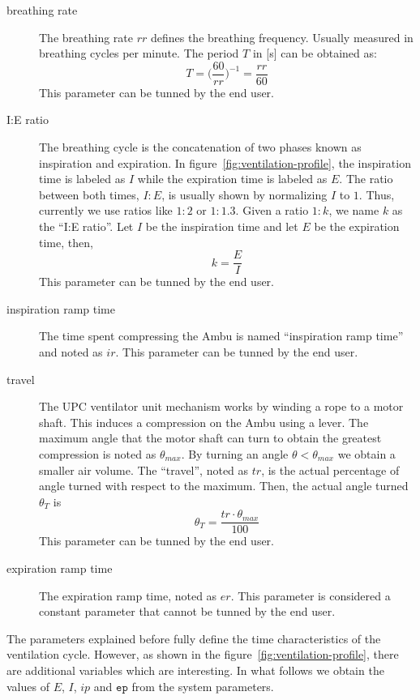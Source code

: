 \documentclass[a4paper]{article}
\begin{document}
\begin{description}
  
\item[breathing rate] The breathing rate $\mathit{rr}$ defines the
  breathing frequency. Usually measured in breathing cycles per
  minute. The period $T$ in [\si{\second}] can be obtained as:
  $$
  T = \bigg(\frac{60}{\mathit{rr}}\bigg)^{-1} = \frac{\mathit{rr}}{60}
  $$
  This parameter can be tunned by the end user.

\item[I:E ratio] The breathing cycle is the concatenation of two
  phases known as inspiration and expiration. In
  figure~\ref{fig:ventilation-profile}, the inspiration time is
  labeled as $I$ while the expiration time is labeled as $E$. The
  ratio between both times, $I:E$, is usually shown by normalizing $I$
  to $1$. Thus, currently we use ratios like $1:2$ or $1:1.3$. Given a
  ratio $1:k$, we name $k$ as the ``I:E ratio''. Let $I$ be the
  inspiration time and let $E$ be the expiration time, then,
  $$
  k=\frac{E}{I}
  $$
  This parameter can be tunned by the end user.
  
\item[inspiration ramp time] The time spent compressing the Ambu is
  named ``inspiration ramp time'' and noted as $\mathit{ir}$.
  This parameter can be tunned by the end user.
  
\item[travel] The UPC ventilator unit mechanism works by winding a
  rope to a motor shaft. This induces a compression on the Ambu using
  a lever. The maximum angle that the motor shaft can turn to obtain
  the greatest compression is noted as $\theta_\textit{max}$. By
  turning an angle $\theta<\theta_\textit{max}$ we obtain a smaller
  air volume. The ``travel'', noted as $\mathit{tr}$, is the actual
  percentage of angle turned with respect to the maximum. Then, the
  actual angle turned $\theta_T$ is
  $$
  \theta_T = \frac{\mathit{tr}\cdot\theta_\mathit{max}}{100}
  $$
  This parameter can be tunned by the end user.
  
\item[expiration ramp time] The expiration ramp time, noted as
  $\mathit{er}$. This parameter is considered a constant parameter
  that cannot be tunned by the end user.

\end{description}

The parameters explained before fully define the time characteristics
of the ventilation cycle. However, as shown in the
figure~\ref{fig:ventilation-profile}, there are additional variables
which are interesting. In what follows we obtain the values of $E$,
$I$, $\mathit{ip}$ and $\mathtt{ep}$ from the system parameters.
\end{document}
